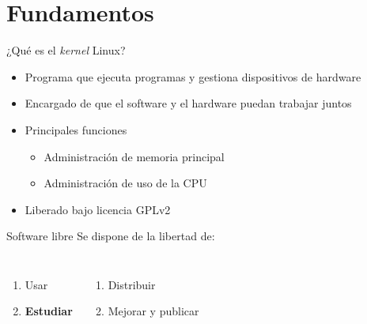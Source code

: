 \section{Fundamentos}

\begin{frame}{¿Qué es el \textit{kernel} Linux?}
  \begin{itemize}
  \item Programa que \alert{ejecuta} programas y \alert{gestiona}
    dispositivos de hardware
  \item Encargado de que el software y el hardware puedan trabajar juntos
  \item Principales funciones
    \begin{itemize}
    \item Administración de \alert{memoria principal}
    \item Administración de \alert{uso de la CPU}
    \end{itemize}
  \item Liberado bajo licencia GPLv2  
  \end{itemize}
  \vfill
  \pause
  \begin{block}{Software libre}
    Se dispone de la \alert{libertad} de: \vspace{-2ex}
    \begin{columns}[t]
      \begin{enumerate}
      \item Usar
      \item \textbf{Estudiar}
      \end{enumerate}
      \begin{enumerate}\addtocounter{enumi}{2}
      \item Distribuir
      \item Mejorar y publicar
      \end{enumerate}
    \end{columns}
  \end{block}
\end{frame}

